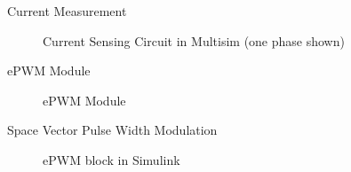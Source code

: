 \begin{frame}{Current Measurement}
	\begin{figure}
		\centering


		\caption{Current Sensing Circuit in Multisim (one phase shown)}
	\end{figure}
\end{frame}


\begin{frame}{ePWM Module}
	\begin{figure}
		\centering


		\caption{ePWM Module}
	\end{figure}
\end{frame}

\begin{frame}{Space Vector Pulse Width Modulation}
	\begin{figure}
		\centering


		\caption{ePWM block in Simulink}
	\end{figure}
\end{frame}


